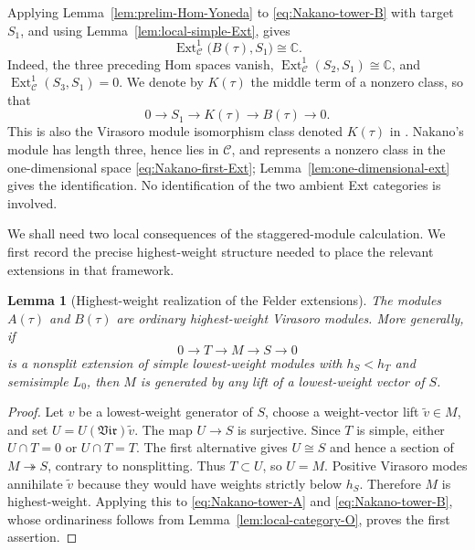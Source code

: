 \documentclass[12pt,leqno]{amsart}
\numberwithin{equation}{section}
\newtheorem{lem}[thm]{Lemma}
\newcommand{\Ext}{\operatorname{Ext}}
\newcommand{\Vir}{\mathfrak{Vir}}
\def\C{\mathbb{C}}
\begin{document}
Applying Lemma~\ref{lem:prelim-Hom-Yoneda} to
\eqref{eq:Nakano-tower-B} with target $S_1$, and using
Lemma~\ref{lem:local-simple-Ext}, gives
\begin{equation}\label{eq:Nakano-first-Ext}
 \Ext^1_{\mathscr C}\bigl(B(\tau),S_1\bigr)\cong\C.
\end{equation}
Indeed, the three preceding Hom spaces vanish,
$\Ext^1_{\mathscr C}(S_2,S_1)\cong\C$, and
$\Ext^1_{\mathscr C}(S_3,S_1)=0$.  We denote by $K(\tau)$ the middle
term of a nonzero class, so that
\begin{equation}\label{eq:Nakano-tower-K}
 0\longrightarrow S_1\longrightarrow K(\tau)
 \longrightarrow B(\tau)\longrightarrow0.
\end{equation}
This is also the Virasoro module isomorphism class denoted $K(\tau)$ in
\cite[Definition~5.10(2)]{Nakano}.  Nakano's module has length three,
hence lies in $\mathscr C$, and represents a nonzero class in the
one-dimensional space \eqref{eq:Nakano-first-Ext};
Lemma~\ref{lem:one-dimensional-ext} gives the identification.  No
identification of the two ambient Ext categories is involved.

We shall need two local consequences of the staggered-module
calculation.  We first record the precise highest-weight structure needed
to place the relevant extensions in that framework.

\begin{lem}[Highest-weight realization of the Felder extensions]
\label{lem:local-highest-weight-realization}
The modules $A(\tau)$ and $B(\tau)$ are ordinary highest-weight
Virasoro modules.  More generally, if
\[
 0\to T\to M\to S\to0
\]
is a nonsplit extension of simple lowest-weight modules with
$h_S<h_T$ and semisimple $L_0$, then $M$ is generated by any lift of a
lowest-weight vector of $S$.
\end{lem}

\begin{proof}
Let $v$ be a lowest-weight generator of $S$, choose a weight-vector lift
$\widetilde v\in M$, and set $U=U(\Vir)\widetilde v$.  The map
$U\to S$ is surjective.  Since $T$ is simple, either $U\cap T=0$ or
$U\cap T=T$.  The first alternative gives $U\cong S$ and hence a
section of $M\twoheadrightarrow S$, contrary to nonsplitting.  Thus
$T\subset U$, so $U=M$.  Positive Virasoro modes annihilate
$\widetilde v$ because they would have weights strictly below $h_S$.
Therefore $M$ is highest-weight.  Applying this to
\eqref{eq:Nakano-tower-A} and \eqref{eq:Nakano-tower-B}, whose
ordinariness follows from Lemma~\ref{lem:local-category-O}, proves the
first assertion.
\end{proof}
\end{document}
